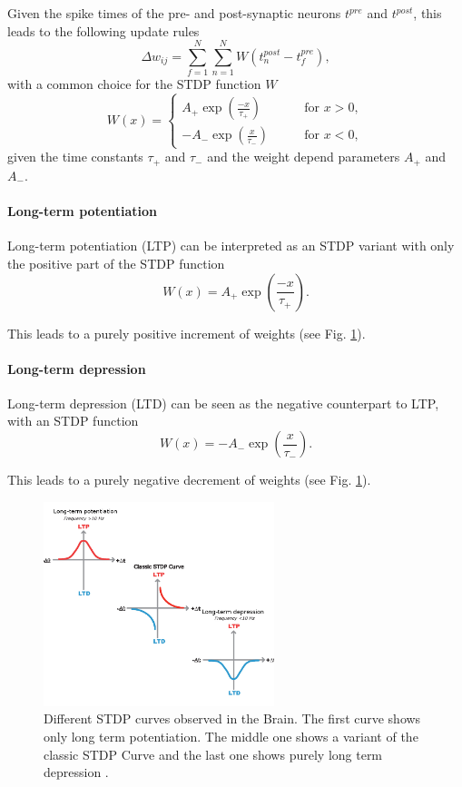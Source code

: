 Given the spike times of the pre- and post-synaptic neurons $t^{pre}$ and $t^{post}$, this leads to the following update rules \cite{gerstner2014neuronal, Sjostrom2010}
\[
\Delta w_{ij} = \sum_{f=1}^N \sum_{n=1}^N W(t^{post}_n - t^{pre}_f),
\]
with a common choice for the STDP function $W$
\[
W(x) =
\begin{cases}
A_+ \exp(\frac{-x}{\tau_+}) \quad \quad &\text{for  } x > 0,  \\
-A_- \exp(\frac{x}{\tau_-}) \quad \quad &\text{for  } x < 0,
\end{cases}
\]
given the time constants $\tau_+$ and $\tau_-$ and the weight depend parameters $A_+$ and $A_-$.
     

\paragraph{Long-term potentiation} \label{c:ltp}
 
Long-term potentiation (LTP) can be interpreted as an STDP variant with only the positive part of the STDP function
\[
W(x) =  A_+ \exp(\frac{-x}{\tau_+}).
\]

This leads to a purely positive increment of weights (see Fig. \ref{fig:stdp}).

\paragraph{Long-term depression} \label{c:ldp}

Long-term depression (LTD) can be seen as the negative counterpart to LTP, with an STDP function
\[
W(x) =  -A_- \exp(\frac{x}{\tau_-}).
\]

This leads to a purely negative decrement of weights (see Fig. \ref{fig:stdp}).

\begin{figure}
	\centering
    	\includegraphics[width=0.6\textwidth]{imgs/stdp_curves.jpg} 
    \caption[STDP curves observed in the Brain.]{Different STDP curves observed in the Brain. The first curve shows only long term potentiation. The middle one shows a variant of the classic STDP Curve and the last one shows purely long term depression \cite{Buchanan2010}.}
	\label{fig:stdp}
\end{figure}